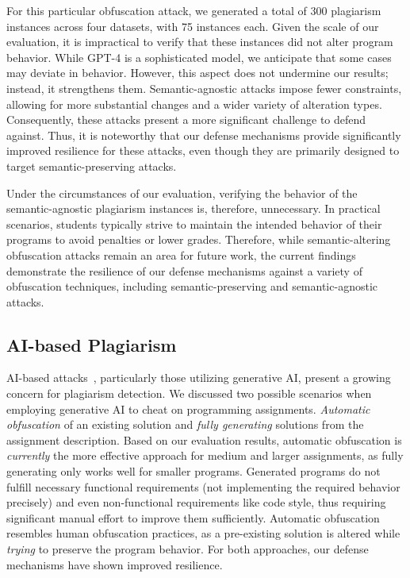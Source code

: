 For this particular obfuscation attack, we generated a total of 300 plagiarism instances across four datasets, with 75 instances each. Given the scale of our evaluation, it is impractical to verify that these instances did not alter program behavior. While GPT-4 is a sophisticated model, we anticipate that some cases may deviate in behavior. However, this aspect does not undermine our results; instead, it strengthens them. Semantic-agnostic attacks impose fewer constraints, allowing for more substantial changes and a wider variety of alteration types. Consequently, these attacks present a more significant challenge to defend against. Thus, it is noteworthy that our defense mechanisms provide significantly improved resilience for these attacks, even though they are primarily designed to target semantic-preserving attacks.

Under the circumstances of our evaluation, verifying the behavior of the semantic-agnostic plagiarism instances is, therefore, unnecessary. In practical scenarios, students typically strive to maintain the intended behavior of their programs to avoid penalties or lower grades. Therefore, while semantic-altering obfuscation attacks remain an area for future work, the current findings demonstrate the resilience of our defense mechanisms against a variety of obfuscation techniques, including semantic-preserving and semantic-agnostic attacks.


\subsection{AI-based Plagiarism}\label{sec:discussion-ai}
AI-based attacks~\cite{Biderman2022}, particularly those utilizing generative AI, present a growing concern for plagiarism detection.
We discussed two possible scenarios when employing generative AI to cheat on programming assignments. \textit{Automatic obfuscation} of an existing solution and \textit{fully generating} solutions from the assignment description.
%
Based on our evaluation results, automatic obfuscation is \textit{currently} the more effective approach for medium and larger assignments, as fully generating only works well for smaller programs. Generated programs do not fulfill necessary functional requirements (not implementing the required behavior precisely) and even non-functional requirements like code style, thus requiring significant manual effort to improve them sufficiently.
Automatic obfuscation resembles human obfuscation practices, as a pre-existing solution is altered while \textit{trying} to preserve the program behavior.
For both approaches, our defense mechanisms have shown improved resilience.


